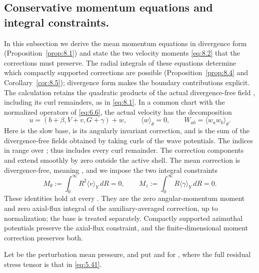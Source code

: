 \subsection{Conservative momentum equations and integral constraints.}\label{sec:8.1}
In this subsection we
derive the mean momentum equations in divergence form (Proposition~\ref{prop:8.1}) and state the
two velocity moments \eqref{eq:8.2} that the corrections must preserve. The radial integrals of these
equations determine which compactly supported corrections are possible (Proposition~\ref{prop:8.4}
and Corollary~\ref{cor:8.5}); divergence form makes the boundary contributions explicit. The calculation
retains the quadratic products of the actual divergence-free field
, including its curl
remainders, as in \eqref{eq:8.1}. In a common chart with the normalized operators of \eqref{eq:6.6}, the actual
velocity has the decomposition
\begin{equation}
  u=(b+\beta,V+v,G+\gamma)+w,
  \qquad \langle w\rangle_\theta=0,
  \qquad W_{ab}=\langle w_aw_b\rangle_\theta.
\tag{8.1}\label{eq:8.1}
\end{equation}
Here  is the slow base,
 is its angularly invariant correction, and
 is the
sum of the divergence-free fields obtained by taking curls of the wave potentials. The indices
in  range over
; thus  includes every curl remainder. The correction
components and  extend smoothly by zero outside the active shell. The mean correction is
divergence-free, meaning , and we impose the two integral constraints
\begin{equation}
  M_\theta:=\int_0^\infty R^2\langle v\rangle_Y\,dR=0,
  \qquad
  M_z:=\int_0^\infty R\langle\gamma\rangle_Y\,dR=0.
\tag{8.2}\label{eq:8.2}
\end{equation}
%
These identities hold at every . They are the zero angular-momentum moment and
zero axial-flux integral of the auxiliary-averaged correction, up to normalization; the base
is treated separately. Compactly supported azimuthal potentials preserve the axial-flux
constraint, and the finite-dimensional moment correction preserves both.

Let  be the perturbation mean pressure, and put
 and
 for
, where the full residual stress tensor is that in \eqref{eq:5.41}.

